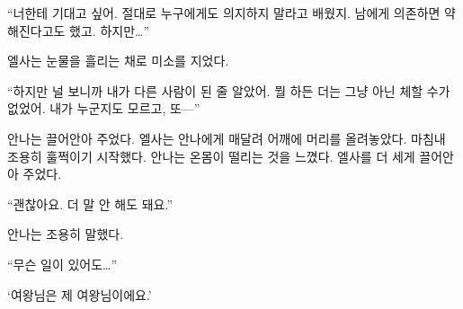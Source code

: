 ``너한테 기대고 싶어. 절대로 누구에게도 의지하지 말라고 배웠지. 남에게 의존하면 약해진다고도 했고. 하지만\ldots''

엘사는 눈물을 흘리는 채로 미소를 지었다.

``하지만 널 보니까 내가 다른 사람이 된 줄 알았어. 뭘 하든 더는 그냥 아닌 체할 수가 없었어. 내가 누군지도 모르고, 또—''

안나는 끌어안아 주었다. 엘사는 안나에게 매달려 어깨에 머리를 올려놓았다. 마침내 조용히 훌쩍이기 시작했다. 안나는 온몸이 떨리는 것을 느꼈다. 엘사를 더 세게 끌어안아 주었다.

``괜찮아요. 더 말 안 해도 돼요.''

안나는 조용히 말했다.

``무슨 일이 있어도\ldots''

`여왕님은 제 여왕님이에요.'

